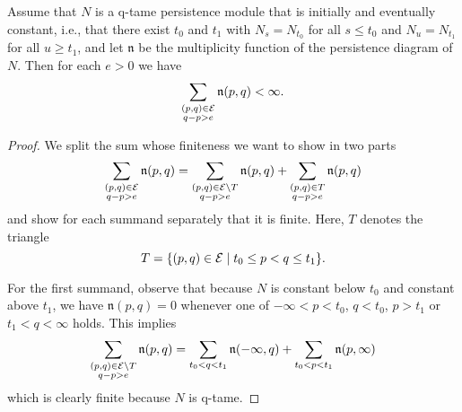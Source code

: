 \begin{thm}
    Assume that $N$ is a q-tame persistence module that is initially and eventually constant, i.e., that there exist $t_0$ and $t_1$ with $N_s = N_{t_0}$ for all $s \leq t_0$ and $N_u = N_{t_1}$ for all $u \geq t_1$, and let $\mathfrak{n}$ be the multiplicity function of the persistence diagram of $N$. Then for each $e>0$ we have 
    \[
    \sum_{ \substack{ (p,q) \in \mathcal{E} \\ q-p > e } } \mathfrak{n} (p,q) < \infty.
    \]
\end{thm}

\begin{proof}
    We split the sum whose finiteness we want to show in two parts
    \[
    \sum_{ \substack{ (p,q) \in \mathcal{E} \\ q-p > e } } \mathfrak{n} (p,q)
    =
    \sum_{ \substack{ (p,q) \in \mathcal{E} \setminus T \\ q-p > e } } \mathfrak{n} (p,q)
    +
    \sum_{ \substack{ (p,q) \in T \\ q-p > e } } \mathfrak{n} (p,q)
    \]
    and show for each summand separately that it is finite. 
    Here, $T$ denotes the triangle
    \[
    T = \{(p,q) \in \mathcal{E} \mid t_0 \leq p < q \leq t_1\}.
    \]
    
    For the first summand, observe that because $N$ is constant below $t_0$ and constant above $t_1$, we have $\mathfrak{n}(p,q) = 0$ whenever one of $-\infty < p < t_0$, $q < t_0$, $p > t_1$ or $t_1 < q < \infty$ holds.
    This implies 
    \[
    \sum_{ \substack{ (p,q) \in \mathcal{E} \setminus T \\ q-p > e } } \mathfrak{n} (p,q)
    =
    \sum_{t_0 < q < t_1} \mathfrak{n} (-\infty,q)
    +
    \sum_{t_0 < p < t_1} \mathfrak{n} (p, \infty)
    \]
    which is clearly finite because $N$ is q-tame.
    

\end{proof}
